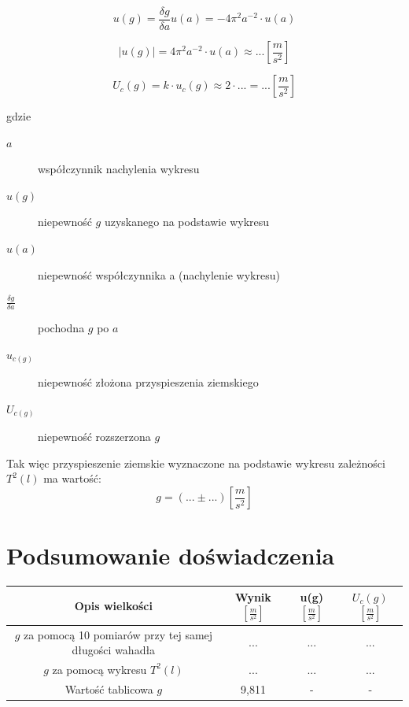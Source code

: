 \documentclass [a4paper,11pt]{article}
\begin{document}
$$ u(g) = \frac{\delta g}{\delta a} u(a) =  - 4 \pi^2 a^{-2} \cdot u(a)$$

$$ |u(g)| =  4 \pi^2 a^{-2} \cdot u(a) \approx ...  \left[ \frac{m}{s^2}\right] $$

$$U_c(g) = k \cdot u_c(g) \approx 2 \cdot ... = ... \left[ \frac{m}{s^2} \right] $$

gdzie 
\begin{description}
\item [$a$] współczynnik nachylenia wykresu
\item [$u(g)$] niepewność $g$ uzyskanego na podstawie wykresu
\item [$u(a)$] niepewność współczynnika a (nachylenie wykresu)
\item [$\frac{\delta g}{\delta a}$] pochodna $g$ po $a$
\item [$u_{c(g)}$] niepewność złożona przyspieszenia ziemskiego
\item [$U_{c(g)}$] niepewność rozszerzona $g$
\end{description}
\indent Tak więc przyspieszenie ziemskie wyznaczone na podstawie wykresu zależności $T^2(l)$ ma wartość:
$$g = (... \pm ...)\left[ \frac{m}{s^2} \right] $$

\section{Podsumowanie doświadczenia}
\begin{table}[h!]
\begin{tabular}{|c|c|c|c|}
\hline Opis wielkości & Wynik $\left[ \frac{m}{s^2} \right]$ & u(g) $\left[ \frac{m}{s^2} \right]$ & $U_c(g)$ $\left[ \frac{m}{s^2} \right]$ \\
\hline $g$ za pomocą 10 pomiarów przy tej samej długości wahadła  & ... & ...  & ...  \\ 
\hline $g$ za pomocą wykresu $T^2(l)$ & ...  & ...  & ...  \\ 
\hline Wartość tablicowa $g$ & 9,811  & -  & -  \\ 
\hline 
\end{tabular} 
\end{table}
\end{document}
